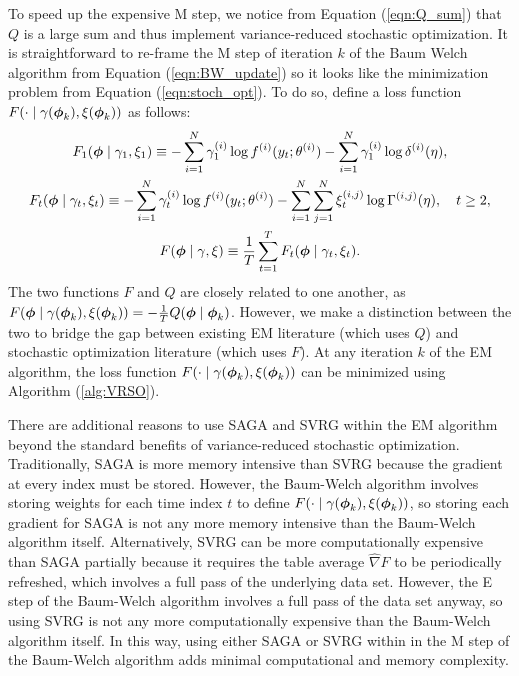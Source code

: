 To speed up the expensive M step, we notice from Equation (\ref{eqn:Q_sum}) that $Q$ is a large sum and thus implement variance-reduced stochastic optimization. It is straightforward to re-frame the M step of iteration $k$ of the Baum Welch algorithm from Equation (\ref{eqn:BW_update}) so it looks like the minimization problem from Equation (\ref{eqn:stoch_opt}). To do so, define a loss function $F(\cdot \mid \gamma(\boldsymbol{\phi}_k),\xi(\boldsymbol{\phi}_k))$ as follows:
%
\begin{gather}
    F_1(\boldsymbol{\phi} \mid \gamma_1,\xi_1) \equiv - \sum_{i=1}^N \gamma^{(i)}_1 \log f^{(i)}(y_t;\theta^{(i)}) - \sum_{i=1}^N \gamma^{(i)}_1 \log \delta^{(i)}(\eta), \\
    F_t(\boldsymbol{\phi} \mid \gamma_t , \xi_t) \equiv - \sum_{i=1}^N \gamma^{(i)}_t \log f^{(i)}(y_t;\theta^{(i)}) - \sum_{i=1}^N \sum_{j=1}^N \xi^{(i,j)}_t \log \Gamma^{(i,j)}(\eta), \quad t \geq 2, \\
    F(\boldsymbol{\phi} \mid \gamma, \xi) \equiv \frac{1}{T}\sum_{t=1}^T F_t(\boldsymbol{\phi} \mid \gamma_t , \xi_t).
\end{gather}
%
%
The two functions $F$ and $Q$ are closely related to one another, as $F(\boldsymbol{\phi} \mid \gamma(\boldsymbol{\phi}_k), \xi(\boldsymbol{\phi}_k)) = - \frac{1}{T} Q(\boldsymbol{\phi} \mid \boldsymbol{\phi}_k)$. However, we make a distinction between the two to bridge the gap between existing EM literature (which uses $Q$) and stochastic optimization literature (which uses $F$). At any iteration $k$ of the EM algorithm, the loss function $F(\cdot \mid \gamma(\boldsymbol{\phi}_k),\xi(\boldsymbol{\phi}_k))$ can be minimized using Algorithm (\ref{alg:VRSO}). %

There are additional reasons to use SAGA and SVRG within the EM algorithm beyond the standard benefits of variance-reduced stochastic optimization. Traditionally, SAGA is more memory intensive than SVRG because the gradient at every index must be stored. However, the Baum-Welch algorithm involves storing weights for each time index $t$ to define $F(\cdot \mid \gamma(\boldsymbol{\phi}_k), \xi(\boldsymbol{\phi}_k))$, so storing each gradient for SAGA is not any more memory intensive than the Baum-Welch algorithm itself. Alternatively, SVRG can be more computationally expensive than SAGA partially because it requires the table average $\widehat \nabla F$ to be periodically refreshed, which involves a full pass of the underlying data set. However, the E step of the Baum-Welch algorithm involves a full pass of the data set anyway, so using SVRG is not any more computationally expensive than the Baum-Welch algorithm itself. In this way, using either SAGA or SVRG within in the M step of the Baum-Welch algorithm adds minimal computational and memory complexity.

